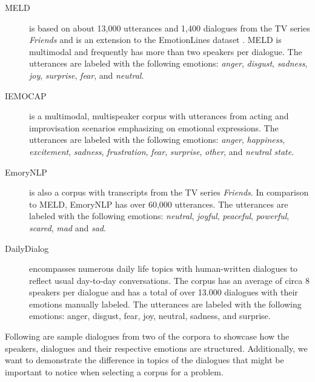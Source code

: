 \documentclass[nofilelist]{cslthse-msc}
\begin{document}
\begin{description}
    \item[MELD] \citep{poria2019meld} is based on about 13,000 utterances and 1,400 dialogues from the TV series \textit{Friends} and is an extension to the EmotionLines dataset \citep{chen2018emotionlines}. MELD is multimodal and  frequently has more than two speakers per dialogue. The utterances are labeled with the following emotions: \textit{anger}, \textit{disgust}, \textit{sadness}, \textit{joy}, \textit{surprise}, \textit{fear}, and \textit{neutral}.

    \item[IEMOCAP] \citep{busso2008iemocap} is a multimodal, multispeaker corpus with utterances from acting and improvisation scenarios emphasizing on emotional expressions. The utterances are labeled with the following emotions: \textit{anger}, \textit{happiness}, \textit{excitement}, \textit{sadness}, \textit{frustration}, \textit{fear}, \textit{surprise}, \textit{other}, and \textit{neutral state}.
    
    \item[EmoryNLP] \citep{zahiri2017emoryNLP} is also a corpus with transcripts from the TV series \textit{Friends}. In comparison to MELD, EmoryNLP has over 60,000 utterances. The utterances are labeled with the following emotions: \textit{neutral}, \textit{joyful}, \textit{peaceful}, \textit{powerful}, \textit{scared}, \textit{mad} and \textit{sad}.
    
    \item[DailyDialog] \citep{lietal2017dailydialog} encompasses numerous daily life topics with human-written dialogues to reflect usual day-to-day conversations. The corpus has an average of circa 8 speakers per dialogue and has a total of over 13.000 dialogues with their emotions manually labeled. The utterances are labeled with the following emotions: anger, disgust, fear, joy, neutral, sadness, and surprise.
\end{description}


Following are sample dialogues from two of the corpora to showcase how the speakers, dialogues and their respective emotions are structured. Additionally, we want to demonstrate the difference in topics of the dialogues that might be important to notice when selecting a corpus for a problem. 
\end{document}
